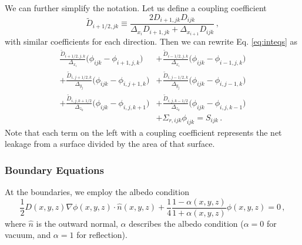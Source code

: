 We can further simplify the notation.  Let us define a coupling coefficient
\begin{equation}
 \tilde{D}_{i+1/2,jk} \equiv 
   \frac{2D_{i+1,jk}D_{ijk}}
        {\Delta_{x_i} D_{i+1,jk} + \Delta_{x_{i+1}} D_{ijk} } \, ,
\end{equation}
with similar coefficients for each direction.  Then 
we can rewrite Eq. \ref{eq:inteqs} as
\begin{equation}
 \begin{split}
     \frac{ \tilde{D}_{i+1/2,j,k}}{\Delta_{x_i}} 
         \Big (\phi_{ijk} - \phi_{i+1,j,k}  \Big ) 
  & +\frac{ \tilde{D}_{i-1/2,j,k}}{\Delta_{x_i}} 
         \Big (\phi_{ijk} - \phi_{i-1,j,k}  \Big ) \\
    +\frac{ \tilde{D}_{i,j+1/2,k}}{\Delta_{y_j}} 
         \Big (\phi_{ijk} - \phi_{i,j+1,k} \Big ) 
  & +\frac{ \tilde{D}_{i,j-1/2,k}}{\Delta_{y_j}} 
         \Big (\phi_{ijk} - \phi_{i,j-1,k} \Big ) \\
    +\frac{ \tilde{D}_{i,j,k+1/2}}{\Delta_{z_k}} 
         \Big (\phi_{ijk} - \phi_{i,j,k+1} \Big ) 
  & +\frac{ \tilde{D}_{i,j,k-1/2}}{\Delta_{z_k}}
         \Big (\phi_{ijk} - \phi_{i,j,k-1} \Big ) \\
  & + \Sigma_{r,ijk} \phi_{ijk} =  S_{ijk} \, .
 \end{split}
 \label{eq:inteqssimp}
\end{equation}
Note that each term on the left with a coupling coefficient represents
the net leakage from a surface divided by the area of that surface.

\subsubsection{Boundary Equations}

At the boundaries, we employ the albedo condition \cite{hebert2009arp}
\begin{equation}
 \frac{1}{2} D(x,y,z) \nabla \phi(x,y,z) \cdot \hat{n}(x,y,z) + 
 \frac{1}{4} \frac{1-\alpha(x,y,z)}{1+\alpha(x,y,z)}\phi(x,y,z) = 0 \, ,
\label{eq:albedo}
\end{equation}
where $\hat{n}$ is the outward normal, $\alpha$ describes the albedo 
condition ($\alpha = 0$ for vacuum, and $\alpha = 1$
for reflection).  

